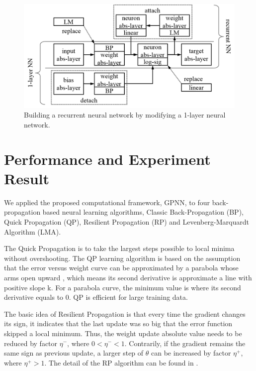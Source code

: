 \documentclass[procedia]{easychair}
\begin{document}
\begin{figure}[h]
    \begin{centering}
        \includegraphics[scale=0.5]{../../pic/reusability.png}
        \caption{Building a recurrent neural network by modifying a 1-layer neural network.}
        \label{fig:reusability}
	\end{centering}
\end{figure}


\section{Performance and Experiment Result}

We applied the proposed computational framework, GPNN, to four back-propagation based neural learning algorithms, Classic Back-Propagation (BP), Quick Propagation (QP), Resilient Propagation (RP) and Levenberg-Marquardt Algorithm (LMA).

The Quick Propagation is to take the largest steps possible to local minima without overshooting.  The QP learning algorithm is based on the assumption that the error versus weight curve can be approximated by a parabola whose arms open upward \cite{fahlman1988empirical}, which means its second derivative is approximate a line with positive slope k.  For a parabola curve, the minimum value is where its second derivative equals to 0.  QP is efficient for large training data.

The basic idea of Resilient Propagation is that every time the gradient changes its sign, it indicates that the last update was so big that the error function skipped a local minimum.  Thus, the weight update absolute value needs to be reduced by factor $ \eta ^ - $, where $ 0 < \eta ^ - < 1 $.  Contrarily, if the gradient remains the same sign as previous update, a larger step of $\theta$ can be increased by factor  $ \eta ^ + $, where $ \eta ^ + > 1 $.  The detail of the RP algorithm can be found in \cite{riedmiller1993direct}.
\end{document}

